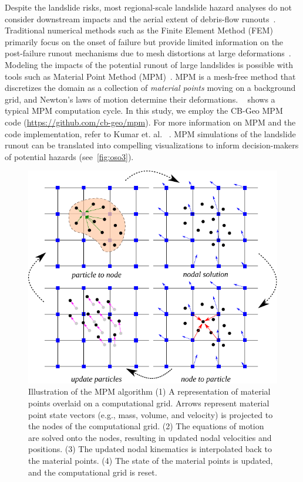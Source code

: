 \documentclass[journal]{IEEEtran}
\begin{document}
Despite the landslide risks, most regional-scale landslide hazard analyses do not consider downstream impacts and the aerial extent of debris-flow runouts~\cite{USGS2017debris}. Traditional numerical methods such as the Finite Element Method (FEM) primarily focus on the onset of failure but provide limited information on the post-failure runout mechanisms due to mesh distortions at large  deformations~\cite{soga2016trends}. Modeling the impacts of the potential runout of large landslides is possible with tools such as Material Point Method (MPM)~\cite{kumar2019scalable}. MPM is a mesh-free method that discretizes the domain as a collection of \textit{material points} moving on a background grid, and Newton's laws of motion determine their deformations. ~ shows a typical MPM computation cycle. In this study, we employ the CB-Geo MPM code (\url{https://github.com/cb-geo/mpm}). For more information on MPM and the code implementation, refer to Kumar et. al. ~\cite{kumar2019scalable}. MPM simulations of the landslide runout can be translated into compelling visualizations to inform decision-makers of potential hazards (see~\cref{fig:oso3}). 



\begin{figure}[tbp]
    \includegraphics[width=\linewidth]{figs/mpm.pdf}
   \caption{Illustration of the MPM algorithm (1) A representation of material points overlaid on a computational grid. Arrows represent material point state vectors (e.g., mass, volume, and velocity) is projected to the nodes of the computational grid. (2) The equations of motion are solved onto the nodes, resulting in updated nodal velocities and positions. (3) The updated nodal kinematics is interpolated back to the material points. (4) The state of the material points is updated, and the computational grid is reset.}
   \label{fig:mpm}
\end{figure}
\end{document}
